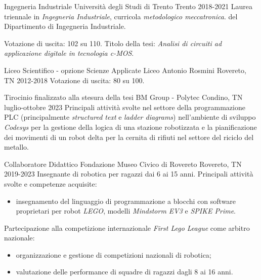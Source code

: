 \documentclass[10pt,a4paper]{report}
\begin{document}
    \begin{study}
        {Ingegneria Industriale}
        {Università degli Studi di Trento}
        {Trento}
        {2018-2021}
        Laurea triennale in \textit{Ingegneria Industriale}, curricola \textit{metodologico meccatronica}. del Dipartimento di Ingegneria Industriale.

        Votazione di uscita: 102 su 110. Titolo della tesi: \textit{Analisi di circuiti ad applicazione digitale in tecnologia c-MOS}.
    \end{study}

    \begin{study}
        {Liceo Scientifico - opzione Scienze Applicate}
        {Liceo Antonio Rosmini}
        {Rovereto, TN}
        {2012-2018}
        Votazione di uscita: 80 su 100.
    \end{study}


    \begin{work}
        {Tirocinio finalizzato alla stesura della tesi}
        {BM Group - Polytec}
        {Condino, TN}
        {luglio-ottobre 2023}
        Principali attività svolte nel settore della programmazione PLC (principalmente \textit{structured text} e \textit{ladder diagrams}) nell'ambiente di sviluppo \textit{Codesys} per la gestione della logica di una stazione robotizzata e la pianificazione dei movimenti di un robot delta per la cernita di rifiuti nel settore del riciclo del metallo.
    \end{work}

    \begin{work}
        {Collaboratore Didattico}
        {Fondazione Museo Civico di Rovereto}
        {Rovereto, TN}
        {2019-2023}
        Insegnante di robotica per ragazzi dai 6 ai 15 anni. Principali attività svolte e competenze acquisite:
        \begin{itemize}
            \item insegnamento del linguaggio di programmazione a blocchi con software proprietari per robot \textit{LEGO}, modelli \textit{Mindstorm EV3} e \textit{SPIKE Prime}.
        \end{itemize}
        Partecipazione alla competizione internazionale \textit{First Lego League} come arbitro nazionale:
        \begin{itemize}
            \item organizzazione e gestione di competizioni nazionali di robotica;
            \item valutazione delle performance di squadre di ragazzi dagli 8 ai 16 anni.
        \end{itemize}
    \end{work}
\end{document}
